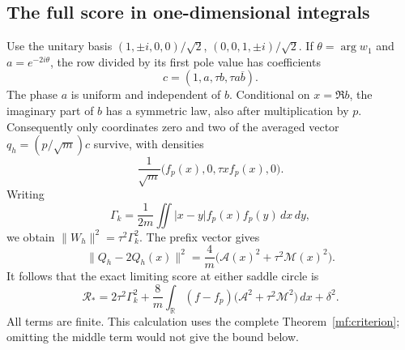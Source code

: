 \subsection{The full score in one-dimensional integrals}

Use the unitary basis
\((1,\pm i,0,0)/\sqrt2\), \((0,0,1,\pm i)/\sqrt2\).
If \(\theta=\arg w_1\) and \(a=e^{-2i\theta}\), the row divided by
its first pole value has coefficients
\begin{equation}\label{mf:four-coefficients}
 c=(1,a,\tau b,\tau a\overline b).
\end{equation}
The phase \(a\) is uniform and independent of \(b\). Conditional on
\(x=\Re b\), the imaginary part of \(b\) has a symmetric law, also
after multiplication by \(p\).
Consequently only coordinates zero and two of the averaged vector
\(q_h=(p/\sqrt m)c\) survive, with densities
\[
 \frac1{\sqrt m}\bigl(f_p(x),0,\tau x f_p(x),0\bigr).
\]
Writing
\begin{equation}\label{mf:four-gamma}
 \Gamma_k=\frac1{2m}\iint|x-y|f_p(x)f_p(y)\,dx\,dy,
\end{equation}
we obtain \(\|W_h\|^2=\tau^2\Gamma_k^2\).
The prefix vector gives
\[
 \|Q_h-2Q_h(x)\|^2
   =\frac4m\bigl(\mathcal A(x)^2+\tau^2\mathcal M(x)^2\bigr).
\]
It follows that the exact limiting score at either saddle circle is
\begin{equation}\label{mf:four-full-score}
 \mathcal R_*=
 2\tau^2\Gamma_k^2+
 \frac8m\int_{\mathbb R}(f-f_p)
         \bigl(\mathcal A^2+\tau^2\mathcal M^2\bigr)\,dx+
 \delta^2.
\end{equation}
All terms are finite. This calculation uses the complete
Theorem~\ref{mf:criterion}; omitting the middle term would not give the
bound below.

